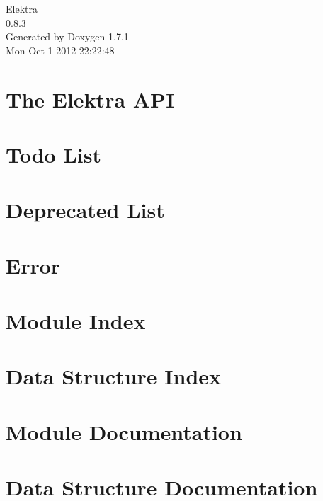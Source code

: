 \documentclass[a4paper]{book}
\begin{document}
\hypersetup{pageanchor=false}
\begin{titlepage}
\vspace*{7cm}
\begin{center}
{\Large Elektra \\[1ex]\large 0.8.3 }\\
\vspace*{1cm}
{\large Generated by Doxygen 1.7.1}\\
\vspace*{0.5cm}
{\small Mon Oct 1 2012 22:22:48}\\
\end{center}
\end{titlepage}
\clearemptydoublepage
{}
\tableofcontents
\clearemptydoublepage
{}
\hypersetup{pageanchor=true}
\chapter{The Elektra API}
\label{index}\hypertarget{index}{}
\chapter{Todo List}
\label{todo}
\hypertarget{todo}{}

\chapter{Deprecated List}
\label{deprecated}
\hypertarget{deprecated}{}

\chapter{Error}
\label{err}
\hypertarget{err}{}

\chapter{Module Index}

\chapter{Data Structure Index}

\chapter{Module Documentation}













\chapter{Data Structure Documentation}








\printindex
\end{document}
